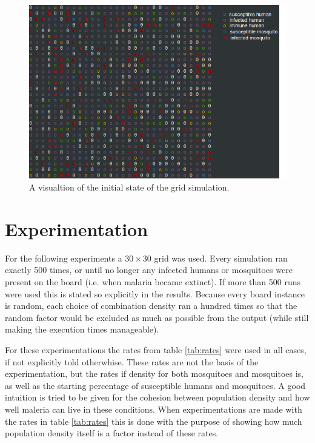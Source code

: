 \documentclass[a4paper]{report}
\begin{document}
\begin{figure}[htbp]
    \centering
    \includegraphics[width=1\textwidth]{malaria_ascii.png}
    \caption{A visualtion of the initial state of the grid simulation. }
    \label{fig:ascii}
\end{figure}

\section{Experimentation} 
For the following experiments a $30 \times 30$ grid was used. Every simulation ran exactly
500 times, or until no longer any infected humans or mosquitoes were present on
the board (i.e. when  malaria became extinct). If more than 500 runs
were used this is stated so explicitly in the results.
Because every board instance is random, each choice of combination density ran
a hundred times so that the random factor would be excluded as much as possible
from the output (while still making the execution times manageable).

For these experimentations the rates from table \ref{tab:rates} were used in all
cases, if not explicitly told otherwhise. These rates are not the basis of the
experimentation, but the rates if  density for both
mosquitoes and mosquitoes is, as well as the starting percentage of susceptible
humans and mosquitoes. A good intuition is tried to be given for the cohesion
between population density and how well maleria can live in these conditions.
When experimentations are made with the rates in table \ref{tab:rates} this is
done with the purpose of showing how much population density itself is a factor
instead of these rates.
\end{document}
